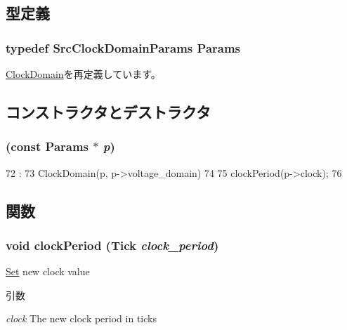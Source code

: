 \subsection{型定義}
\hypertarget{classSrcClockDomain_a782eceafbcc65d65fa25b7ca97e38b2d}{
\subsubsection[{Params}]{\setlength{\rightskip}{0pt plus 5cm}typedef SrcClockDomainParams {\bf Params}}}
\label{classSrcClockDomain_a782eceafbcc65d65fa25b7ca97e38b2d}


\hyperlink{classClockDomain_a38704c6bd51f0677b46da34c8fe16a38}{ClockDomain}を再定義しています。

\subsection{コンストラクタとデストラクタ}
\hypertarget{classSrcClockDomain_aae9e61f29a07480bc9efff8be6cc2459}{
\subsubsection[{SrcClockDomain}]{ (const {\bf Params} $\ast$ {\em p})}}
\label{classSrcClockDomain_aae9e61f29a07480bc9efff8be6cc2459}



\begin{DoxyCode}
72                                               :
73     ClockDomain(p, p->voltage_domain)
74 {
75     clockPeriod(p->clock);
76 }

\end{DoxyCode}


\subsection{関数}
\hypertarget{classSrcClockDomain_a799c3553bc74c99bf84d42e1750ad07e}{
\subsubsection[{clockPeriod}]{\setlength{\rightskip}{0pt plus 5cm}void clockPeriod ({\bf Tick} {\em clock\_\-period})}}
\label{classSrcClockDomain_a799c3553bc74c99bf84d42e1750ad07e}
\hyperlink{classSet}{Set} new clock value 
\begin{DoxyParams}{引数}
\item[{\em clock}]The new clock period in ticks \end{DoxyParams}



